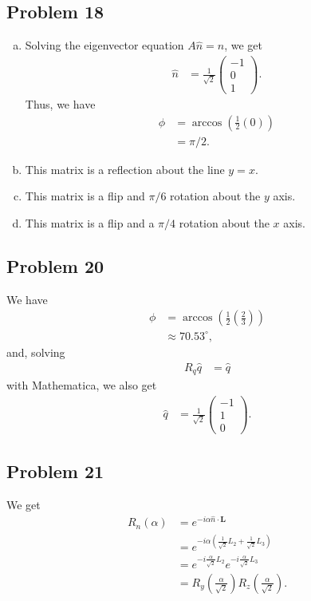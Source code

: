 \documentclass[10pt]{mypackage}
\begin{document}
\subsection{Problem 18}%
\begin{enumerate}[(a)]
  \item Solving the eigenvector equation $A\hat{n} = \hat{n}$, we get
    \begin{align*}
      \hat{n} &= \frac{1}{\sqrt{2}} \begin{pmatrix}-1\\0\\1\end{pmatrix}.
    \end{align*}
    Thus, we have
    \begin{align*}
      \phi &= \arccos\left(\frac{1}{2}\left(0\right)\right)\\
           &= \pi/2.
    \end{align*}
  \item This matrix is a reflection about the line $y=x$.
  \item This matrix is a flip and $\pi/6$ rotation about the $y$ axis.
  \item This matrix is a flip and a $\pi/4$ rotation about the $x$ axis.
\end{enumerate}
\subsection{Problem 20}%
We have
\begin{align*}
  \phi &= \arccos\left(\frac{1}{2}\left(\frac{2}{3}\right)\right)\\
       &\approx 70.53^{\circ},
\end{align*}
and, solving
\begin{align*}
  R_q\hat{q} &= \hat{q}
\end{align*}
with Mathematica, we also get
\begin{align*}
  \hat{q} &= \frac{1}{\sqrt{2}} \begin{pmatrix}-1\\1\\0\end{pmatrix}.
\end{align*}
\subsection{Problem 21}%
We get
\begin{align*}
  R_{n}\left(\alpha\right) &= e^{-i\alpha \hat{n}\cdot \mathbf{L}}\\
                           &= e^{-i\alpha \left(\frac{1}{\sqrt{2}}L_2 + \frac{1}{\sqrt{2}}L_3\right)}\\
                           &= e^{-i\frac{\alpha}{\sqrt{2}}L_2}e^{-i\frac{\alpha}{\sqrt{2}}L_3}\\
                           &= R_{y}\left(\frac{\alpha}{\sqrt{2}}\right)R_{z}\left(\frac{\alpha}{\sqrt{2}}\right).
\end{align*}
\end{document}
